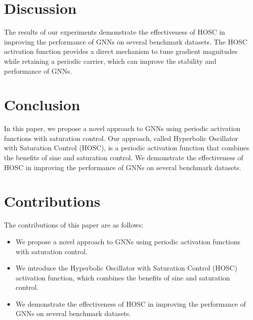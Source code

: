 \documentclass{article}
\begin{document}
        \section{Discussion}
        The results of our experiments demonstrate the effectiveness of HOSC in improving the performance of GNNs on several benchmark datasets. The HOSC activation function provides a direct mechanism to tune gradient magnitudes while retaining a periodic carrier, which can improve the stability and performance of GNNs.

        \section{Conclusion}
        In this paper, we propose a novel approach to GNNs using periodic activation functions with saturation control. Our approach, called Hyperbolic Oscillator with Saturation Control (HOSC), is a periodic activation function that combines the benefits of sine and saturation control. We demonstrate the effectiveness of HOSC in improving the performance of GNNs on several benchmark datasets.

        \section{Contributions}
        The contributions of this paper are as follows:

        \begin{itemize}
        \item We propose a novel approach to GNNs using periodic activation functions with saturation control.
        \item We introduce the Hyperbolic Oscillator with Saturation Control (HOSC) activation function, which combines the benefits of sine and saturation control.
        \item We demonstrate the effectiveness of HOSC in improving the performance of GNNs on several benchmark datasets.
        \end{itemize}

        
\end{document}

